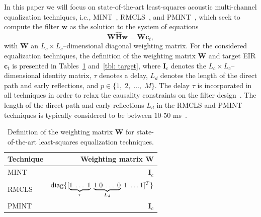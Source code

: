 \documentclass[10pt]{IEEEtran}
\begin{document}
In this paper we will focus on state-of-the-art least-squares acoustic multi-channel equalization techniques, i.e., MINT~\cite{Miyoshi_ITASS_1988}, RMCLS~\cite{Lim_ITASLP_2014}, and PMINT~\cite{Kodrasi_ITASLP_2013}, which seek to compute the filter $\mathbf{w}$ as the solution to the system of equations
\begin{equation}
\label{eq: syseq}
\mathbf{W}\hat{\mathbf{H}}\mathbf{w} = \mathbf{W}\mathbf{c}_t,
\end{equation}
with $\mathbf{W}$ an $L_c \times L_c$--dimensional diagonal weighting matrix.
For the considered equalization techniques, the definition of the weighting matrix $\mathbf{W}$ and target EIR $\mathbf{c}_t$ is presented in Tables~\ref{tbl: weighting} and~\ref{tbl: target}, where $\mathbf{I}_c$ denotes the $L_c \times L_c$--dimensional identity matrix, $\tau$ denotes a delay, $L_d$ denotes the length of the direct path and early reflections, and $p \in \{1, \; 2, \; \ldots, \; M \}$.
The delay $\tau$ is incorporated in all techniques in order to relax the causality constraints on the filter design~\cite{Hikichi_EURASIP_2007}.
The length of the direct path and early reflections $L_d$ in the RMCLS and PMINT techniques is typically considered to be between $10$-$50$ ms~\cite{Lim_ITASLP_2014, Kodrasi_ITASLP_2013}.
\begin{table}[b!]
\begin{center}
  \caption{Definition of the weighting matrix $\mathbf{W}$ for state-of-the-art least-squares equalization techniques.}
  \label{tbl: weighting}
  \begin{tabularx}{\linewidth}{Xr}
    \toprule
    Technique & Weighting matrix $\mathbf{W}$ \\
    \midrule
    MINT & {\color{white}{${\rm{diag}}\{[\underbrace{1 \; \ldots \; 1}_{\tau} \; \underbrace{1 \; 0 \; \ldots \; 0}_{L_d} \; 1 \; \ldots 1]^{T}\}$}} $\mathbf{I}_c$\\
    RMCLS & ${\rm{diag}}\{[\underbrace{1 \; \ldots \; 1}_{\tau} \; \underbrace{1 \; 0 \; \ldots \; 0}_{L_d} \; 1 \; \ldots 1]^{T}\}$\\
    PMINT & $\mathbf{I}_c$ \\
    \bottomrule
  \end{tabularx}
\end{center}
\end{table}
\end{document}
